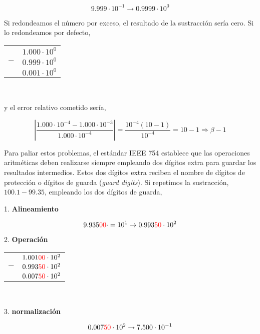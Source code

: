\begin{equation*}
9.999\cdot10^{-1}\rightarrow0.9999\cdot10^0
\end{equation*} 
\begin{paracol}{2}
Si redondeamos el número por exceso, el resultado de la sustracción sería cero. Si lo redondeamos por defecto,
\end{paracol}
\begin{tabular}{c r}
&$1.000\cdot10^0$\\
$-$&$0.999\cdot10^0$\\
\hline
&$0.001\cdot10^0$
\end{tabular}\\

\begin{paracol}{2}
y el error relativo cometido sería,
\end{paracol}

\begin{equation*}
\left\vert\frac{1.000\cdot10^{-4}-1.000\cdot10^{-3}}{1.000\cdot10^{-4}}\right\vert=\frac{10^{-4}(10-1)}{10^{-4}}=10-1\Rightarrow\beta -1
\end{equation*}

\begin{paracol}{2}
Para paliar estos problemas, el estándar IEEE 754 establece que las operaciones aritméticas deben realizarse siempre empleando dos dígitos extra para guardar los resultados intermedios. Estos dos dígitos extra reciben el nombre de dígitos de protección o dígitos de guarda (\emph{guard digits}).
Si repetimos la sustracción, $100.1-99.35$, empleando los dos dígitos de guarda,

1. \textbf{Alineamiento}
\end{paracol}
\begin{equation*}
9.935{\color{red}00}\cdot=10^1\rightarrow 0.993{\color{red}50} \cdot 10^2
\end{equation*}

\begin{paracol}{2}
2. \textbf{Operación}
\end{paracol}
\begin{tabular}{c r}
&$1.001{\color{red}00} \cdot10^2$\\
$-$&$0.993{\color{red}50}\cdot10^2$\\
\hline
&$0.007{\color{red}50}\cdot10^2$
\end{tabular}\\

\begin{paracol}{2}
3. \textbf{normalización}
\end{paracol}
\begin{equation*}
0.007{\color{red}50}\cdot10^2\rightarrow 7.500\cdot10^{-1}
\end{equation*}

